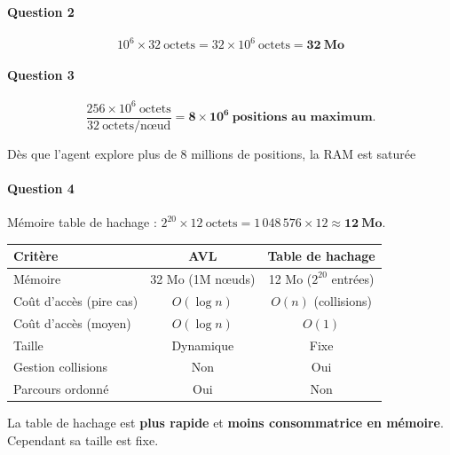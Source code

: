 \documentclass[a4paper,11pt]{article}
\newcommand{\boitereponse}[1]{%
  \begin{mdframed}[linecolor=black!40, backgroundcolor=white, linewidth=0.5pt,
                   innertopmargin=6pt, innerbottommargin=6pt]
  #1
  \end{mdframed}
}
\begin{document}
\paragraph{Question 2}

\[
  10^6 \times 32\ \text{octets} = 32 \times 10^6\ \text{octets} = \mathbf{32\ \text{Mo}}
\]

\paragraph{Question 3}

\[
  \frac{256 \times 10^6\ \text{octets}}{32\ \text{octets/nœud}} = \mathbf{8 \times 10^6}\ \textbf{positions au maximum.}
\]

\boitereponse{Dès que l'agent explore plus de 8 millions de positions, la RAM est saturée}

\paragraph{Question 4}

Mémoire table de hachage : $2^{20} \times 12\ \text{octets} = 1\,048\,576 \times 12 \approx \mathbf{12\ \text{Mo}}$.

\begin{center}
\begin{tabular}{lcc}
\toprule
Critère                  & AVL              & Table de hachage \\
\midrule
Mémoire                  & 32 Mo (1M nœuds) & 12 Mo ($2^{20}$ entrées) \\
Coût d'accès (pire cas)  & $O(\log n)$      & $O(n)$ (collisions) \\
Coût d'accès (moyen)     & $O(\log n)$      & $O(1)$ \\
Taille                   & Dynamique        & Fixe \\
Gestion collisions       & Non              & Oui \\
Parcours ordonné         & Oui              & Non \\
\bottomrule
\end{tabular}
\end{center}

\boitereponse{%
La table de hachage est \textbf{plus rapide} et \textbf{moins consommatrice en mémoire}.
Cependant sa taille est fixe.
}
\newpage
\end{document}
